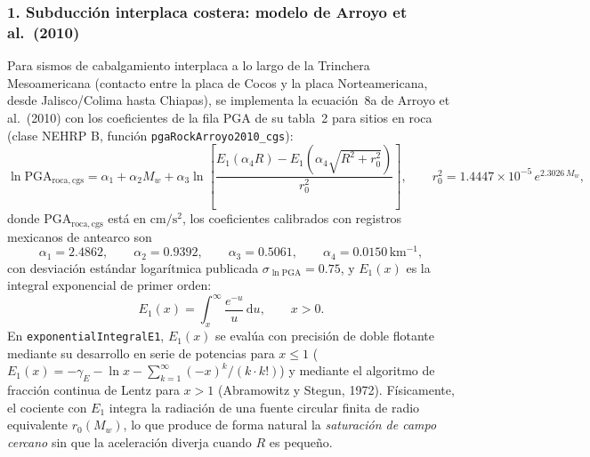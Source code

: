 \documentclass[11pt,a4paper]{article}
\newcommand{\dd}{\mathrm d}
\newcommand{\unit}[1]{\mathrm{#1}}
\begin{document}
\subsubsection*{1. Subducción interplaca costera: modelo de Arroyo et al.\ (2010)}
Para sismos de cabalgamiento interplaca a lo largo de la Trinchera Mesoamericana (contacto entre la placa de
Cocos y la placa Norteamericana, desde Jalisco/Colima hasta Chiapas), se implementa la ecuación~8a de Arroyo
et al.\ (2010) con los coeficientes de la fila $\mathrm{PGA}$ de su tabla~2 para sitios en roca (clase NEHRP B,
función \texttt{pgaRockArroyo2010\_cgs}):
\begin{equation}
  \ln\mathrm{PGA}_{\mathrm{roca,cgs}}
  = \alpha_1 + \alpha_2 M_w + \alpha_3\ln\!\left[
    \frac{E_1(\alpha_4 R) - E_1\!\left(\alpha_4\sqrt{R^2 + r_0^2}\right)}{r_0^2}
  \right],
  \qquad
  r_0^2 = 1.4447\times 10^{-5}\,e^{2.3026\,M_w},
  \label{eq:gmpe-arroyo}
\end{equation}
donde $\mathrm{PGA}_{\mathrm{roca,cgs}}$ está en $\unit{cm/s^2}$, los coeficientes calibrados con registros
mexicanos de antearco son
\[
  \alpha_1 = 2.4862,\qquad
  \alpha_2 = 0.9392,\qquad
  \alpha_3 = 0.5061,\qquad
  \alpha_4 = 0.0150\,\unit{km^{-1}},
\]
con desviación estándar logarítmica publicada $\sigma_{\ln\mathrm{PGA}} = 0.75$, y $E_1(x)$ es la integral
exponencial de primer orden:
\begin{equation}
  E_1(x) = \int_x^\infty \frac{e^{-u}}{u}\,\dd u, \qquad x > 0.
  \label{eq:integral-exponencial}
\end{equation}
En \texttt{exponentialIntegralE1}, $E_1(x)$ se evalúa con precisión de doble flotante mediante su desarrollo en
serie de potencias para $x\le 1$ ($E_1(x) = -\gamma_E - \ln x - \sum_{k=1}^\infty (-x)^k/(k\cdot k!)$) y
mediante el algoritmo de fracción continua de Lentz para $x>1$ (Abramowitz y Stegun, 1972). Físicamente, el
cociente con $E_1$ integra la radiación de una fuente circular finita de radio equivalente $r_0(M_w)$, lo que
produce de forma natural la \emph{saturación de campo cercano} sin que la aceleración diverja cuando $R$ es
pequeño.
\end{document}
